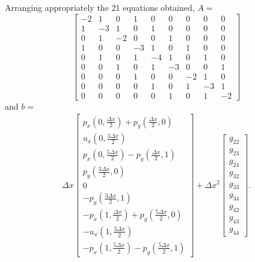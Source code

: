 \documentclass[journal]{IEEEtran}
\begin{document}
Arranging appropriately the 21 equations obtained, $A=$\begin{equation}
\left[\begin{array}{ccccccccc}
-2 & 1 & 0 & 1 & 0 & 0 & 0 & 0 & 0\\
1 & -3 & 1 & 0 & 1 & 0 & 0 & 0 & 0\\
0 & 1 & -2 & 0 & 0 & 1 & 0 & 0 & 0\\
1 & 0 & 0 & -3 & 1 & 0 & 1 & 0 & 0\\
0 & 1 & 0 & 1 & -4 & 1 & 0 & 1 & 0\\
0 & 0 & 1 & 0 & 1 & -3 & 0 & 0 & 1\\
0 & 0 & 0 & 1 & 0 & 0 & -2 & 1 & 0\\
0 & 0 & 0 & 0 & 1 & 0 & 1 & -3 & 1\\
0 & 0 & 0 & 0 & 0 & 1 & 0 & 1 & -2 
\end{array}\right]
\end{equation} and $b=$ \begin{eqnarray}
\Delta x\left[\begin{array}{c}
p_x\left(0, \frac{\Delta x}{2}\right) + p_y\left(\frac{\Delta x}{2},0\right)\\
u_x\left(0, \frac{3\Delta x}{2}\right)\\
p_x\left(0, \frac{5\Delta x}{2}\right) - p_y\left(\frac{\Delta x}{2},1\right)\\
p_y\left(\frac{3\Delta x}{2},0\right)\\
0 \\
-p_y\left(\frac{3\Delta x}{2},1\right)\\
-p_x\left(1, \frac{\Delta x}{2}\right) + p_y\left(\frac{5\Delta x}{2},0\right)\\
-u_x\left(1, \frac{3\Delta x}{2}\right)\\
-p_x\left(1, \frac{5\Delta x}{2}\right) - p_y\left(\frac{5\Delta x}{2}, 1\right)
\end{array}\right] + \Delta x^2 \left[\begin{array}{c}
g_{22} \\ g_{23} \\ g_{24} \\ g_{32} \\ g_{33} \\ g_{34} \\ g_{42} \\ g_{43}  \\ g_{44}\end{array}\right]. \label{bPartnulleigen}
\end{eqnarray}
\end{document}

